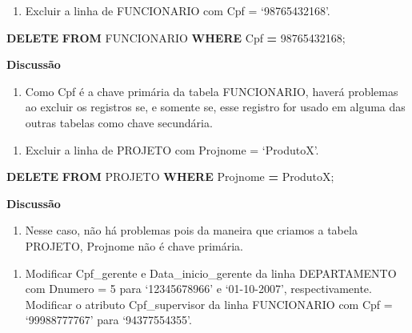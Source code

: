 \documentclass[
]{article}
\newenvironment{Shaded}{\begin{snugshade}}{\end{snugshade}}
\newcommand{\KeywordTok}[1]{\textcolor[rgb]{0.13,0.29,0.53}{\textbf{#1}}}
\newcommand{\NormalTok}[1]{#1}
\newcommand{\OperatorTok}[1]{\textcolor[rgb]{0.81,0.36,0.00}{\textbf{#1}}}
\newcommand{\StringTok}[1]{\textcolor[rgb]{0.31,0.60,0.02}{#1}}
\providecommand{\tightlist}{%
  \setlength{\itemsep}{0pt}\setlength{\parskip}{0pt}}
\begin{document}
\begin{enumerate}
\def\labelenumi{\arabic{enumi}.}
\setcounter{enumi}{6}
\tightlist
\item
  Excluir a linha de FUNCIONARIO com Cpf = `98765432168'.
\end{enumerate}

\begin{Shaded}
\begin{Highlighting}[]
\KeywordTok{DELETE} \KeywordTok{FROM}\NormalTok{ FUNCIONARIO }\KeywordTok{WHERE}\NormalTok{ Cpf }\OperatorTok{=} \StringTok{\textquotesingle{}98765432168\textquotesingle{}}\NormalTok{;}
\end{Highlighting}
\end{Shaded}

\textbf{Discussão}

\begin{enumerate}
\def\labelenumi{\roman{enumi}.}
\tightlist
\item
  Como Cpf é a chave primária da tabela FUNCIONARIO, haverá problemas ao
  excluir os registros se, e somente se, esse registro for usado em
  alguma das outras tabelas como chave secundária.
\end{enumerate}

\begin{enumerate}
\def\labelenumi{\arabic{enumi}.}
\setcounter{enumi}{7}
\tightlist
\item
  Excluir a linha de PROJETO com Projnome = `ProdutoX'.
\end{enumerate}

\begin{Shaded}
\begin{Highlighting}[]
\KeywordTok{DELETE} \KeywordTok{FROM}\NormalTok{ PROJETO }\KeywordTok{WHERE}\NormalTok{ Projnome }\OperatorTok{=} \StringTok{\textquotesingle{}ProdutoX\textquotesingle{}}\NormalTok{;}
\end{Highlighting}
\end{Shaded}

\textbf{Discussão}

\begin{enumerate}
\def\labelenumi{\roman{enumi}.}
\tightlist
\item
  Nesse caso, não há problemas pois da maneira que criamos a tabela
  PROJETO, Projnome não é chave primária.
\end{enumerate}

\begin{enumerate}
\def\labelenumi{\arabic{enumi}.}
\setcounter{enumi}{8}
\tightlist
\item
  Modificar Cpf\_gerente e Data\_inicio\_gerente da linha DEPARTAMENTO
  com Dnumero = 5 para `12345678966' e `01-10-2007', respectivamente.
  Modificar o atributo Cpf\_supervisor da linha FUNCIONARIO com Cpf =
  `99988777767' para `94377554355'.
\end{enumerate}
\end{document}
